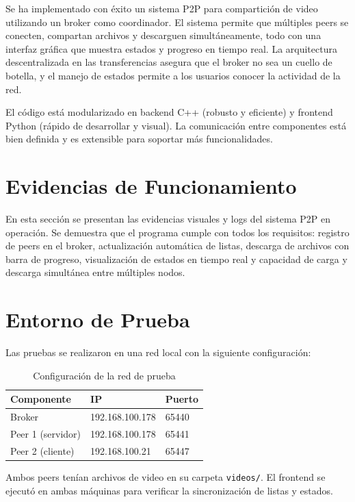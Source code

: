 \documentclass[12pt]{article}
\begin{document}
Se ha implementado con éxito un sistema P2P para compartición de video utilizando un broker como coordinador. El sistema permite que múltiples peers se conecten, compartan archivos y descarguen simultáneamente, todo con una interfaz gráfica que muestra estados y progreso en tiempo real. La arquitectura descentralizada en las transferencias asegura que el broker no sea un cuello de botella, y el manejo de estados permite a los usuarios conocer la actividad de la red.

El código está modularizado en backend C++ (robusto y eficiente) y frontend Python (rápido de desarrollar y visual). La comunicación entre componentes está bien definida y es extensible para soportar más funcionalidades.

\section{Evidencias de Funcionamiento}

En esta sección se presentan las evidencias visuales y logs del sistema P2P en operación. Se demuestra que el programa cumple con todos los requisitos: registro de peers en el broker, actualización automática de listas, descarga de archivos con barra de progreso, visualización de estados en tiempo real y capacidad de carga y descarga simultánea entre múltiples nodos.

\section{Entorno de Prueba}

Las pruebas se realizaron en una red local con la siguiente configuración:

\begin{table}[H]
\centering
\begin{tabular}{|p{4cm}|p{4cm}|p{4cm}|}
\hline
\textbf{Componente} & \textbf{IP} & \textbf{Puerto} \\
\hline
Broker & 192.168.100.178 & 65440 \\
Peer 1 (servidor) & 192.168.100.178 & 65441 \\
Peer 2 (cliente) & 192.168.100.21 & 65447 \\
\hline
\end{tabular}
\caption{Configuración de la red de prueba}
\end{table}

Ambos peers tenían archivos de video en su carpeta \texttt{videos/}. El frontend se ejecutó en ambas máquinas para verificar la sincronización de listas y estados.
\end{document}
